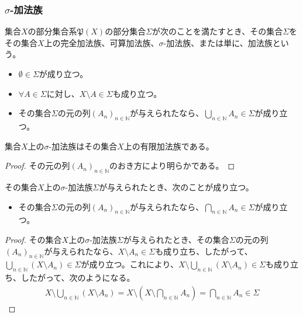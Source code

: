 \documentclass[dvipdfmx]{jsarticle}
\begin{document}
\subsubsection{$\sigma$-加法族}%
\begin{axs}
集合$X$の部分集合系$\mathfrak{P}(X)$の部分集合$\varSigma$が次のことを満たすとき、その集合$\varSigma$をその集合$X$上の完全加法族、可算加法族、$\sigma$-加法族、または単に、加法族という。
\begin{itemize}
\item
  $\emptyset \in \varSigma$が成り立つ。
\item
  $\forall A \in \varSigma$に対し、$X \setminus A \in \varSigma$も成り立つ。
\item
  その集合$\varSigma$の元の列$\left( A_{n} \right)_{n \in \mathbb{N}}$が与えられたなら、$\bigcup_{n \in \mathbb{N}} A_{n} \in \varSigma$が成り立つ。
\end{itemize}
\end{axs}
\begin{thm}\label{4.5.2.3}
集合$X$上の$\sigma$-加法族はその集合$X$上の有限加法族である。
\end{thm}
\begin{proof}
その元の列$\left( A_{n} \right)_{n \in \mathbb{N}}$のおき方により明らかである。
\end{proof}
\begin{thm}\label{4.5.2.4}
その集合$X$上の$\sigma$-加法族$\varSigma$が与えられたとき、次のことが成り立つ。
\begin{itemize}
\item
  その集合$\varSigma$の元の列$\left( A_{n} \right)_{n \in \mathbb{N}}$が与えられたなら、$\bigcap_{n \in \mathbb{N}} A_{n} \in \varSigma$が成り立つ。
\end{itemize}
\end{thm}
\begin{proof}
その集合$X$上の$\sigma$-加法族$\varSigma$が与えられたとき、その集合$\varSigma$の元の列$\left( A_{n} \right)_{n \in \mathbb{N}}$が与えられたなら、$X \setminus A_{n} \in \varSigma$も成り立ち、したがって、$\bigcup_{n \in \mathbb{N}} \left( X \setminus A_{n} \right) \in \varSigma$が成り立つ。これにより、$X \setminus \bigcup_{n \in \mathbb{N}} \left( X \setminus A_{n} \right) \in \varSigma$も成り立ち、したがって、次のようになる。
\begin{align*}
X \setminus \bigcup_{n \in \mathbb{N}} \left( X \setminus A_{n} \right) = X \setminus \left( X \setminus \bigcap_{n \in \mathbb{N}} A_{n} \right) = \bigcap_{n \in \mathbb{N}} A_{n} \in \varSigma
\end{align*}
\end{proof}
\end{document}
